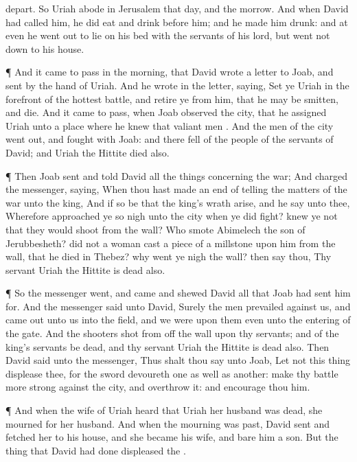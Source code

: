 {depart. So
Uriah
abode in
Jerusalem that
day, and the
morrow.
And when
David had
called him, he did
eat and
drink
before him; and he made him
drunk: and at
even he went
out to
lie on his
bed with the
servants of his
lord, but went not
down to his
house.
\par }{\PP {}¶ And it came to pass in the
morning, that
David
wrote a
letter to
Joab, and
sent
{} by the
hand of
Uriah.
And he
wrote in the
letter,
saying,
Set ye
Uriah in the
forefront of the
hottest
battle, and
retire ye from
him, that he may be
smitten, and
die.
And it came to pass, when
Joab
observed the
city, that he
assigned
Uriah unto a
place where he
knew that
valiant
men
{}.
And the
men of the
city went
out, and
fought with
Joab: and there
fell
{} of the
people of the
servants of
David; and
Uriah the
Hittite
died also.
\par }{\PP {}¶ Then
Joab
sent and
told
David all the
things concerning the
war;
And
charged the
messenger,
saying, When thou hast made an
end of
telling the
matters of the
war unto the
king,
And if so be that the
king’s
wrath
arise, and he
say unto thee, Wherefore approached ye so
nigh unto the
city when ye did
fight?
knew ye not that they would
shoot from the
wall?
Who
smote
Abimelech the
son of
Jerubbesheth? did not a
woman
cast a
piece of a
millstone upon him from the
wall, that he
died in
Thebez? why went ye
nigh the
wall? then
say thou, Thy
servant
Uriah the
Hittite is
dead also.
\par }{\PP {}¶ So the
messenger
went, and
came and
shewed
David all that
Joab had
sent him for.
And the
messenger
said unto
David, Surely the
men
prevailed against us, and came
out unto us into the
field, and we were upon them even unto the
entering of the
gate.
And the
shooters
shot from off the
wall upon thy
servants; and
{} of the
king’s
servants be
dead, and thy
servant
Uriah the
Hittite is
dead also.
Then
David
said unto the
messenger, Thus shalt thou
say unto
Joab, Let not this
thing
displease thee, for the
sword
devoureth one as well as
another: make thy
battle more
strong against the
city, and
overthrow it: and
encourage thou him.
\par }{\PP {}¶ And when the
wife of
Uriah
heard that
Uriah her
husband was
dead, she
mourned for her
husband.
And when the
mourning was
past,
David
sent and
fetched her to his
house, and she became his
wife, and
bare him a
son. But the
thing that
David had
done
displeased the
{}.

}
